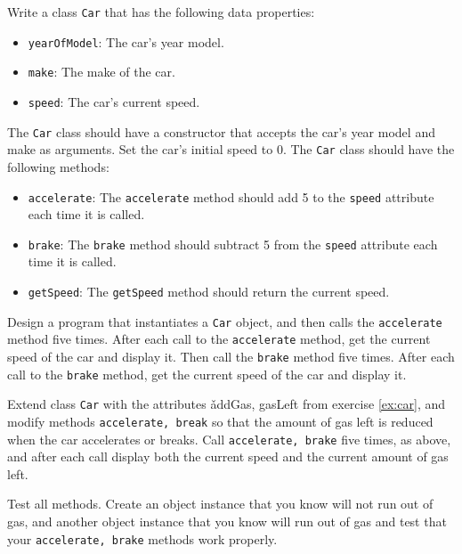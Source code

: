 Write a class \lstinline{Car} that has the following data properties:
  \begin{itemize}
  \item \lstinline{yearOfModel}: The car's year model.
  \item \lstinline{make}: The make of the car.
  \item \lstinline{speed}: The car's current speed.
  \end{itemize}
  The \lstinline{Car} class should have a constructor that accepts the car's year model and make as arguments. Set the car's initial speed to 0.  The \texttt{Car} class should have the following methods:
  \begin{itemize}
  \item \lstinline{accelerate}: The \lstinline{accelerate} method should add 5 to the \texttt{speed} attribute each time it is called.
  \item \lstinline{brake}: The \lstinline{brake} method should subtract 5 from the \texttt{speed} attribute each time it is called.
  \item \lstinline{getSpeed}: The \lstinline{getSpeed} method should return the current speed.
  \end{itemize}
  Design a program that instantiates a \lstinline{Car} object, and then calls the \lstinline{accelerate} method five times. After each call to the \lstinline{accelerate} method, get the current speed of the car and display it. Then call the \lstinline{brake} method five times. After each call to the \lstinline{brake} method, get the current speed of the car and display it.
  
  Extend class \lstinline{Car} with the attributes \v{addGas, gasLeft} from exercise \ref{ex:car}, and modify methods \lstinline{accelerate, break} so that the amount of gas left is reduced when the car accelerates or breaks. Call \lstinline{accelerate, brake} five times, as above, and after each call display both the current speed and the current amount of gas left.
  
  Test all methods. Create an object instance that you know will not run out of gas, and another object instance that you know will run out of gas and test that your \lstinline{accelerate, brake} methods work properly.
  